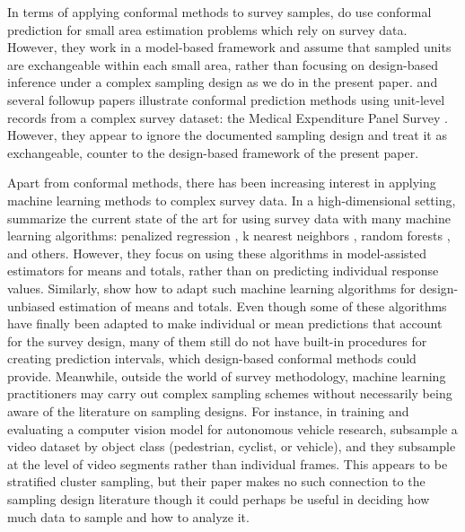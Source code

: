 \documentclass[10.5pt, letterpaper]{article}
\numberwithin{table}{section}
\numberwithin{figure}{section}
\numberwithin{equation}{section}
\begin{document}
In terms of applying conformal methods to survey samples, \cite{bersson2022optimal} do use conformal prediction for small area estimation problems which rely on survey data. However, they work in a model-based framework and assume that sampled units are exchangeable within each small area, rather than focusing on design-based inference under a complex sampling design as we do in the present paper.
\cite{romano2019conformalized} and several followup papers \citep{sesia2020comparison, sesia2021conformal, feldman2021improving, bai2022efficient} illustrate conformal prediction methods using unit-level records from a complex survey dataset: the Medical Expenditure Panel Survey \citep{ahrq2017meps}. However, they appear to ignore the documented sampling design and treat it as exchangeable, counter to the design-based framework of the present paper.

Apart from conformal methods, there has been increasing interest in applying machine learning methods to complex survey data. In a high-dimensional setting, \cite{dagdoug2022model} summarize the current state of the art for using survey data with many machine learning algorithms: penalized regression \citep{mcconville2017model}, k nearest neighbors \citep{yang2019nearest}, random forests \citep{dagdoug2021model}, and others. However, they focus on using these algorithms in model-assisted estimators for means and totals, rather than on predicting individual response values. Similarly, \cite{sande2021design} show how to adapt such machine learning algorithms for design-unbiased estimation of means and totals.
Even though some of these algorithms have finally been adapted to make individual or mean predictions that account for the survey design, many of them still do not have built-in procedures for creating prediction intervals, which design-based conformal methods could provide.
Meanwhile, outside the world of survey methodology, machine learning practitioners may carry out complex sampling schemes without necessarily being aware of the literature on sampling designs. For instance, in training and evaluating a computer vision model for autonomous vehicle research, \cite{jund2021scalable} subsample a video dataset by object class (pedestrian, cyclist, or vehicle), and they subsample at the level of video segments rather than individual frames. This appears to be stratified cluster sampling, but their paper makes no such connection to the sampling design literature though it could perhaps be useful in deciding how much data to sample and how to analyze it.
\end{document}

